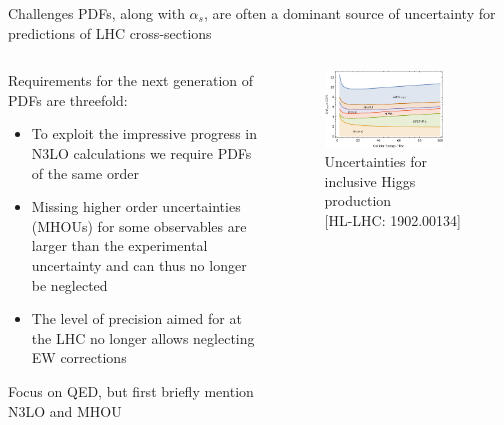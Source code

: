 \documentclass[aspectratio=169, 8pt,t]{beamer}
\begin{document}
\begin{frame}{Challenges}
  PDFs, along with $\alpha_s$, are often a dominant source of uncertainty for predictions of LHC cross-sections 
  \begin{columns}
    \begin{column}{0.49\textwidth}
      \vspace*{1em}

      Requirements for the next generation of PDFs are threefold:
      \begin{itemize}
        \item To exploit the impressive progress in N3LO calculations we require PDFs of the same order
        \item Missing higher order uncertainties (MHOUs) for some observables are larger than the experimental uncertainty and can thus no longer be neglected
        \item The level of precision aimed for at the LHC no longer allows neglecting EW corrections
      \end{itemize}

      \vspace*{1em}
      Focus on QED, but first briefly mention N3LO and MHOU
    \end{column}

    \begin{column}{0.49\textwidth}
      \begin{figure}
        \includegraphics[width=0.8\textwidth]{figures/sources_of_unceratinty.pdf}
        \caption*{Uncertainties for inclusive Higgs production \\ 
        \color{gray}\small [HL-LHC: 1902.00134]}
      \end{figure}
    \end{column}
  \end{columns}
\end{frame}
\end{document}
